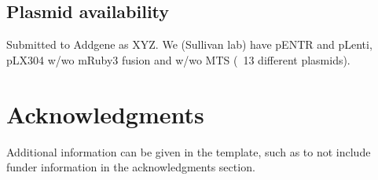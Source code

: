 \documentclass[9pt,lineno]{elife}
\begin{document}
\subsection{Plasmid availability}
Submitted to Addgene as XYZ.
We (Sullivan lab) have pENTR and pLenti, pLX304 w/wo mRuby3 fusion and w/wo MTS (~13 different plasmids).





























\section{Acknowledgments}

Additional information can be given in the template, such as to not include funder information in the acknowledgments section.

\nocite{*} %

\end{document}
